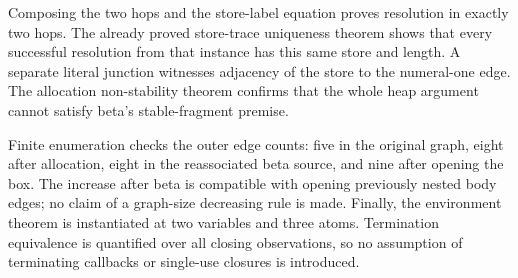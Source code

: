 









Composing the two hops and the store-label equation proves resolution in
exactly two hops. The already proved store-trace uniqueness theorem shows
that every successful resolution from that instance has this same store and
length. A separate literal junction witnesses adjacency of the store to the
numeral-one edge. The allocation non-stability theorem confirms that the
whole heap argument cannot satisfy beta's stable-fragment premise.

Finite enumeration checks the outer edge counts: five in the original graph,
eight after allocation, eight in the reassociated beta source, and nine after
opening the box. The increase after beta is compatible with opening previously
nested body edges; no claim of a graph-size decreasing rule is made. Finally,
the environment theorem is instantiated at two variables and three atoms.
Termination equivalence is quantified over all closing observations, so no
assumption of terminating callbacks or single-use closures is introduced.




